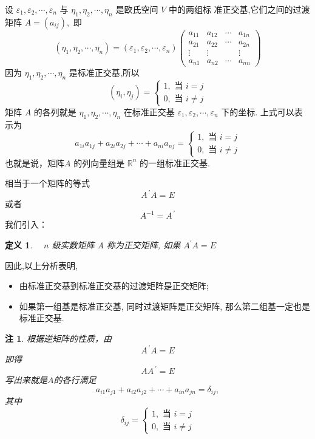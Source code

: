 \documentclass[13pt]{beamer}
\newtheorem*{defi}{定义}
\newtheorem*{rem}{注}
\def\Rn{\mathbb{R}^n}
\begin{document}
\begin{frame}
设 ${\varepsilon}_{1}, {\varepsilon}_{2}, \cdots, {\varepsilon}_{n}$ 与 ${\eta}_{1}, {\eta}_{2}, \cdots, {\eta}_{n}$ 是欧氏空间 $V$ 中的两组标
准正交基,它们之间的过渡矩阵 ${A}=\left(a_{i j}\right),$ 即
\[
\left(\eta_{1}, \eta_{2}, \cdots, \eta_{n}\right)=\left(\varepsilon_{1}, \varepsilon_{2}, \cdots, \varepsilon_{n}\right)\left(\begin{array}{cccc}
a_{11} & a_{12} & \cdots & a_{1 n} \\
a_{21} & a_{22} & \cdots & a_{2 n} \\
\vdots & \vdots & & \vdots \\
a_{n 1} & a_{n 2} & \cdots & a_{n n}
\end{array}\right)
\]
因为 ${\eta}_{1}, {\eta}_{2}, \cdots, {\eta}_{n}$ 是标准正交基,所以
\[
\left({\eta}_{i}, {\eta}_{j}\right)=\left\{\begin{array}{l}
1, \text { 当 } i=j \\
0, \text { 当 } i \neq j
\end{array}\right.
\]
矩阵 $A$ 的各\alert{列}就是 ${\eta}_{1}, {\eta}_{2}, \cdots, {\eta}_{n}$ 在标准正交基 ${\varepsilon}_{1}, {\varepsilon}_{2}, \cdots, {\varepsilon}_{n}$ 下的坐标.
上式可以表示为
\[
a_{1 i} a_{1 j}+a_{2 i} a_{2 j}+\cdots+a_{n i} a_{n j}=\left\{\begin{array}{l}
1, \text { 当 } i=j \\
0, \text { 当 } i \neq j
\end{array}\right.
\]
也就是说，矩阵$A$ 的列向量组是 $\Rn$ 的一组标准正交基.
\end{frame}




\begin{frame}
相当于一个矩阵的等式
\[
A^{\, \prime} A=E
\]
或者
\[
{A}^{-1}={A}^{\, \prime}
\]
我们引入： 
\begin{defi}
$\quad n$ 级实数矩阵 A 称为\alert{正交矩阵}, 如果  $A^{\prime} {A}={E}$
\end{defi}
 因此,以上分析表明,
 \begin{itemize}
	\item 由标准正交基到标准正交基的过渡矩阵是正交矩阵;
 	\item 如果第一组基是标准正交基, 同时过渡矩阵是正交矩阵, 那么第二组基一定也是标准正交基.
 \end{itemize}

\end{frame}


\begin{frame}
\begin{rem}
根据逆矩阵的性质，由
\[
{A}^{\, \prime} {A}={E}
\]
即得
\[
A A^{\, \prime}=E
\]
写出来就是$A$的各\alert{行}满足
\[
a_{i 1} a_{j 1}+a_{i 2} a_{j 2}+\cdots+a_{i n} a_{j n}=\delta_{i j}, 
\]
其中 \[
\delta_{i j}=
\left\{\begin{array}{l}
1, \text { 当 } i=j \\
0, \text { 当 } i \neq j
\end{array}\right.
\]
\end{rem}

\end{frame}
\end{document}
